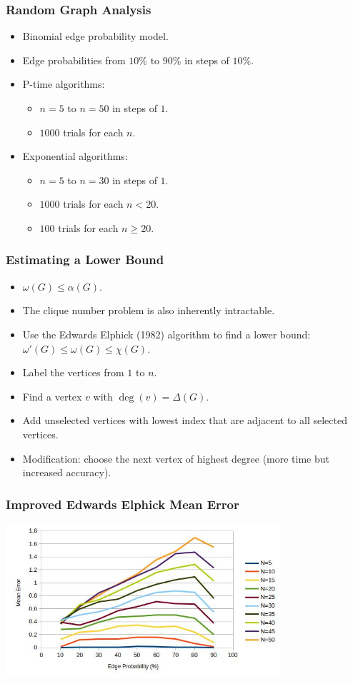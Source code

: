 \documentclass{beamer}
\renewcommand{\a}{\alpha}
\newcommand{\w}{\omega}
\newcommand{\D}{\Delta}
\newcommand{\X}{\chi}
\begin{document}
\begin{frame}
  \frametitle{Random Graph Analysis}
  \begin{itemize}
  \item Binomial edge probability model.
  \item Edge probabilities from \(10\%\) to \(90\%\) in steps of \(10\%\).
  \item P-time algorithms:
    \begin{itemize}
    \item \(n=5\) to \(n=50\) in steps of \(1\).
    \item \(1000\) trials for each \(n\).
    \end{itemize}
  \item Exponential algorithms:
    \begin{itemize}
    \item \(n=5\) to \(n=30\) in steps of \(1\).
    \item \(1000\) trials for each \(n<20\).
    \item \(100\) trials for each \(n\ge20\).
    \end{itemize}
  \end{itemize}
\end{frame}

\begin{frame}
  \frametitle{Estimating a Lower Bound}
  \begin{itemize}
  \item \(\w(G)\le\a(G)\).
  \item The clique number problem is also inherently intractable.
  \item Use the Edwards Elphick (1982) algorithm to find a lower bound: \(\w'(G)\le\w(G)\le\X(G)\).
  \item Label the vertices from \(1\) to \(n\).
  \item Find a vertex \(v\) with \(\deg(v)=\D(G)\).
  \item Add unselected vertices with lowest index that are adjacent to all selected vertices.
  \item Modification: choose the next vertex of highest degree (more time but increased accuracy).
  \end{itemize}
\end{frame}

\begin{frame}
  \frametitle{Improved Edwards Elphick Mean Error}
  \begin{center}
    \includegraphics[width=4in]{../final/edwards2_error}
  \end{center}
\end{frame}
\end{document}
